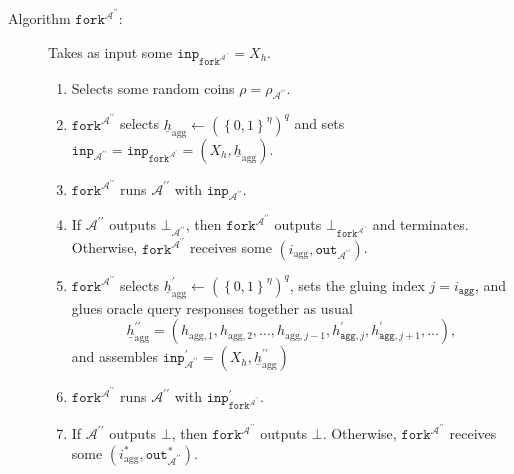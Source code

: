 \documentclass{mrl}
\theoremstyle{definition}
\numberwithin{theorem}{subsection}
\newcommand{\adversary}{\mathcal{A}}
\begin{document}
\begin{description}

\item [Algorithm $\texttt{fork}^{\adversary^{\prime \prime}}$:] Takes as input some $\texttt{inp}_{\texttt{fork}^{\adversary^{\prime \prime}}} = X_h$. 
\begin{enumerate}
\item Selects some random coins $\rho = \rho_{\adversary^{\prime \prime}}$.

\item $\texttt{fork}^{\adversary^{\prime \prime}}$  selects $\underline{h}_{\text{agg}} \leftarrow (\left\{0,1\right\}^{\eta})^q$ and sets $\texttt{inp}_{\adversary^{\prime\prime}} = \texttt{inp}_{\texttt{fork}^{\adversary^\prime}} = (X_h,  \underline{h}_{\text{agg}})$.

\item $\texttt{fork}^{\adversary^{\prime \prime}}$ runs $\adversary^{\prime\prime}$ with $\texttt{inp}_{\adversary^{\prime\prime}}$.

\item If $\adversary^{\prime\prime}$ outputs $\bot_{\adversary^{\prime\prime}}$, then  $\texttt{fork}^{\adversary^{\prime \prime}}$ outputs $\bot_{\texttt{fork}^{\adversary^{\prime \prime}}}$ and terminates. Otherwise, $\texttt{fork}^{\adversary^{\prime \prime}}$ receives some $(i_{\text{agg}}, \texttt{out}_{\adversary^{\prime \prime}})$.


\item $\texttt{fork}^{\adversary^{\prime \prime}}$ selects $\underline{h}_{\text{agg}}^{\prime} \leftarrow (\left\{0,1\right\}^\eta)^q$, sets the gluing index $j = i_{\texttt{agg}}$, and glues oracle query responses together as usual \[\underline{h}_{\text{agg}}^{\prime \prime}= (h_{\text{agg},1}, h_{\text{agg},2}, \ldots, h_{\text{agg}, j - 1}, h^{\prime}_{\texttt{agg}, j}, h^{\prime}_{\texttt{agg}, j+1}, \ldots),\] and assembles $\texttt{inp}^{\prime}_{\adversary^{\prime \prime}} = (X_h, \underline{h}_{\text{agg}}^{\prime \prime})$

\item $\texttt{fork}^{\adversary^{\prime \prime}}$ runs $\adversary^{\prime \prime}$ with $\texttt{inp}^{\prime}_{\texttt{fork}^{\adversary^{\prime \prime}}}$.



\item If $\adversary^{\prime \prime}$ outputs $\bot$, then $\texttt{fork}^{\adversary^{\prime \prime}}$ outputs $\bot$. Otherwise, $\texttt{fork}^{\adversary^{\prime \prime}}$ receives some $(i_{\text{agg}}^*, \texttt{out}_{\adversary^{\prime \prime}}^*)$.



\end{enumerate}
\end{description}
\end{document}

